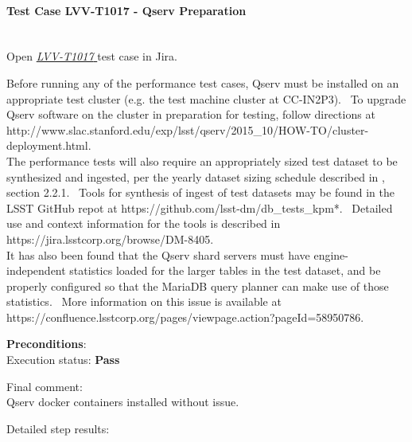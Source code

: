 \documentclass[DM,lsstdraft,STR,toc]{lsstdoc}
\begin{document}
    \paragraph{Test Case LVV-T1017 - Qserv Preparation
 }\mbox{}\\

Open  \href{https://jira.lsstcorp.org/secure/Tests.jspa#/testCase/LVV-T1017}{\textit{ LVV-T1017 } }
test case in Jira.

    Before running any of the performance test cases, Qserv must be
installed on an appropriate test cluster (e.g. the test machine cluster
at CC-IN2P3). ~To upgrade Qserv software on the cluster in preparation
for testing, follow directions at
http://www.slac.stanford.edu/exp/lsst/qserv/2015\_10/HOW-TO/cluster-deployment.html.\\[2\baselineskip]The
performance tests will also require an appropriately sized test dataset
to be synthesized and ingested, per the yearly dataset sizing schedule
described in , section 2.2.1. ~Tools for synthesis of ingest of
test datasets may be found in the LSST GitHub repot at
https://github.com/lsst-dm/db\_tests\_kpm*. ~Detailed use and context
information for the tools is described in
https://jira.lsstcorp.org/browse/DM-8405.\\[2\baselineskip]It has also
been found that the Qserv shard servers must have engine-independent
statistics loaded for the larger tables in the test dataset, and be
properly configured so that the MariaDB query planner can make use of
those statistics. ~More information on this issue is available at
https://confluence.lsstcorp.org/pages/viewpage.action?pageId=58950786.


    \textbf{ Preconditions}:\\
    

    Execution status: {\bf Pass }

    Final comment:\\Qserv docker containers installed without issue.



    Detailed step results:
\end{document}
